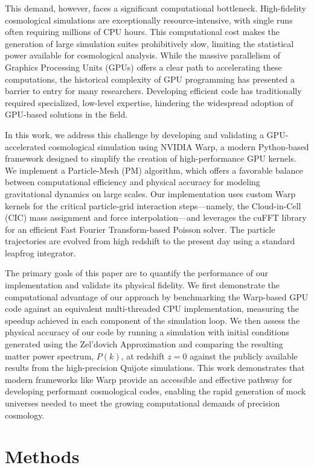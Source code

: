 \documentclass[]{article}
\begin{document}
This demand, however, faces a significant computational bottleneck. High-fidelity cosmological simulations are exceptionally resource-intensive, with single runs often requiring millions of CPU hours. This computational cost makes the generation of large simulation suites prohibitively slow, limiting the statistical power available for cosmological analysis. While the massive parallelism of Graphics Processing Units (GPUs) offers a clear path to accelerating these computations, the historical complexity of GPU programming has presented a barrier to entry for many researchers. Developing efficient code has traditionally required specialized, low-level expertise, hindering the widespread adoption of GPU-based solutions in the field.

In this work, we address this challenge by developing and validating a GPU-accelerated cosmological simulation using NVIDIA Warp, a modern Python-based framework designed to simplify the creation of high-performance GPU kernels. We implement a Particle-Mesh (PM) algorithm, which offers a favorable balance between computational efficiency and physical accuracy for modeling gravitational dynamics on large scales. Our implementation uses custom Warp kernels for the critical particle-grid interaction steps—namely, the Cloud-in-Cell (CIC) mass assignment and force interpolation—and leverages the cuFFT library for an efficient Fast Fourier Transform-based Poisson solver. The particle trajectories are evolved from high redshift to the present day using a standard leapfrog integrator.

The primary goals of this paper are to quantify the performance of our implementation and validate its physical fidelity. We first demonstrate the computational advantage of our approach by benchmarking the Warp-based GPU code against an equivalent multi-threaded CPU implementation, measuring the speedup achieved in each component of the simulation loop. We then assess the physical accuracy of our code by running a simulation with initial conditions generated using the Zel'dovich Approximation and comparing the resulting matter power spectrum, $P(k)$, at redshift $z=0$ against the publicly available results from the high-precision Quijote simulations. This work demonstrates that modern frameworks like Warp provide an accessible and effective pathway for developing performant cosmological codes, enabling the rapid generation of mock universes needed to meet the growing computational demands of precision cosmology.

\section{Methods}
\label{sec:methods}
\end{document}
